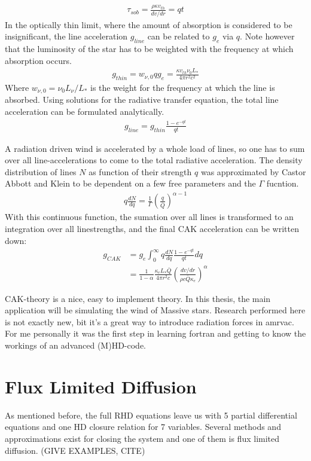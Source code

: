 \begin{align}
\tau_{sob} = \frac{\rho \kappa v_{th}}{dv/dr} = qt
\end{align}
In the optically thin limit, where the amount of absorption is considered to be insignificant, the line acceleration $g_{line}$ can be related to $g_e$ via $q$. Note however that the luminosity of the star has to be weighted with the frequency at which absorption occurs. 
\begin{align}
g_{thin} = w_{\nu,0} q g_e = \frac{\kappa v_{th} \nu_0 L_*}{4 \pi r^2 c^2}
\end{align}
Where $w_{\nu,0} = \nu_0 L_\nu / L_*$ is the weight for the frequency at which the line is absorbed. Using solutions for the radiative transfer equation, the total line acceleration can be formulated analytically.
\begin{align}
g_{line} = g_{thin} \frac{1 - e^{-qt}}{qt} 
\end{align}

A radiation driven wind is accelerated by a whole load of lines, so one has to sum over all line-accelerations to come to the total radiative acceleration. The density distribution of lines $N$ as function of their strength $q$ was approximated by Castor Abbott and Klein to be dependent on a few free parameters and the $\Gamma$ fucntion.
\begin{align} 
q \frac{dN}{dq} = \frac{1}{\Gamma} \left(\frac{q}{\bar{Q}} \right)^{\alpha - 1}
\end{align}
With this continuous function, the sumation over all lines is transformed to an integration over all linestrengths, and the final CAK acceleration can be written down:
\begin{align}
g_{CAK} &= g_e \int_0^\infty q \frac{dN}{dq} \frac{1 - e^{-qt}}{qt} dq \\
        &= \frac{1}{1-\alpha} \frac{\kappa_e L_* \bar{Q}}{4\pi r^2 c} \left( \frac{dv/dr}{\rho c \bar{Q} \kappa_e} \right)^\alpha \label{g_CAK}
\end{align}

CAK-theory is a nice, easy to implement theory. In this thesis, the main application will be simulating the wind of Massive stars. Research performed here is not exactly new, bit it's a great way to introduce radiation forces in amrvac. For me personally it was the first step in learning fortran and getting to know the workings of an advanced (M)HD-code.


\section{Flux Limited Diffusion} \label{section: introduction Flux Limited Diffusion}
As mentioned before, the full RHD equations leave us with 5 partial differential equations and one HD closure relation for 7 variables. Several methods and approximations exist for closing the system and one of them is flux limited diffusion. (GIVE EXAMPLES, CITE)\\

